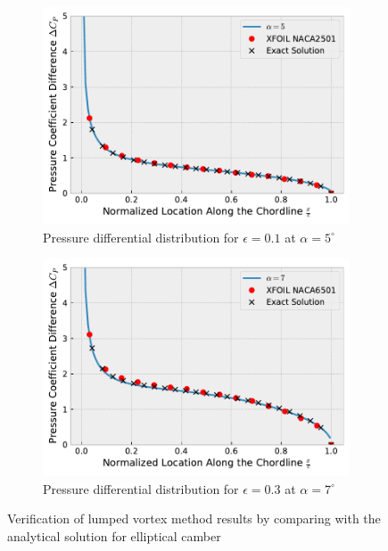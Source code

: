 \begin{figure}[h]
  \centering
  \begin{subfigure}{.5\textwidth}
    \centering
    \captionsetup{width=.8\linewidth}
    \includegraphics[width=.9\linewidth]{static/thin_airfoil_verification_a5.pdf}
    \caption{\centering Pressure differential distribution for $\epsilon = 0.1$ at $\alpha = 5^{\circ}$}
    \label{fig:thin_verif1}
  \end{subfigure}%
  \begin{subfigure}{.5\textwidth}
    \centering
    \captionsetup{width=.8\linewidth}
    \includegraphics[width=.9\linewidth]{static/thin_airfoil_verification_a7.pdf}
    \caption{\centering Pressure differential distribution for $\epsilon = 0.3$ at $\alpha = 7^{\circ}$}
    \label{fig:thin_verif2}
  \end{subfigure}
  \caption{\centering Verification of lumped vortex method results by comparing with the analytical solution for elliptical camber \cite{katz_plotkin}}
  \label{fig:thin_verif}
\end{figure}


